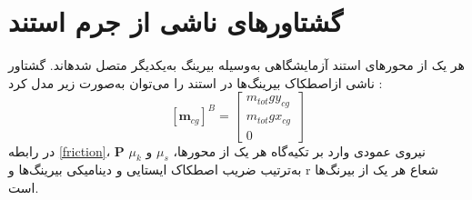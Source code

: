 \section{گشتاورهای ناشی از جرم استند}

هر یک از محورهای استند آزمایشگاهی به‌وسیله بیرینگ به‌یکدیگر متصل شدهاند. گشتاور ناشی ازاصطکاک بیرینگ‌ها در استند را می‌توان به‌صورت زیر مدل کرد
\cite{Arabolye}
:
\begin{equation}\label{friction}
	[\boldsymbol m_ {cg}]^B = \begin{bmatrix}
		m_{tot}gy_{cg} \\
		m_{tot}gx_{cg} \\
		0
	\end{bmatrix}
\end{equation}
در رابطه \ref{friction}، $\boldsymbol P$ نیروی عمودی وارد بر تکیه‌گاه هر یک از محورها، $\mu_s$ و $\mu_k$ به‌ترتیب ضریب اصطکاک
ایستایی و دینامیکی بیرینگ‌ها و r شعاع هر یک از بیرنگ‌ها است.
